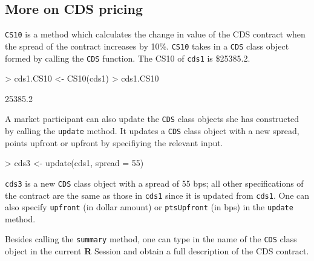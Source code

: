 \documentclass[a4paper]{article}
\renewenvironment{Schunk}{\vspace{\topsep}}{\vspace{\topsep}}
\begin{document}
\subsection{More on CDS pricing}

\texttt{CS10} is a method which calculates the change in value of the
CDS contract when the spread of the contract increases by
10\%. \texttt{CS10} takes in a \texttt{CDS} class object formed by
calling the \texttt{CDS} function. The CS10 of \texttt{cds1} is
\$25385.2.

\begin{Schunk}
\begin{Sinput}
> cds1.CS10 <- CS10(cds1)
> cds1.CS10
\end{Sinput}
\begin{Soutput}
[1] 25385.2
\end{Soutput}
\end{Schunk}

A market participant can also update the \texttt{CDS} class objects she
has constructed by calling the \texttt{update} method. It updates a
\texttt{CDS} class object with a new spread, points upfront or upfront
by specifiying the relevant input.

\begin{Schunk}
\begin{Sinput}
> cds3 <- update(cds1, spread = 55)
\end{Sinput}
\end{Schunk}

\texttt{cds3} is a new \texttt{CDS} class object with a spread of 55
bps; all other specifications of the contract are the same as those in
\texttt{cds1} since it is updated from \texttt{cds1}. One can also
specify \texttt{upfront} (in dollar amount) or \texttt{ptsUpfront} (in
bps) in the \texttt{update} method.

Besides calling the \texttt{summary} method, one can type in the name
of the \texttt{CDS} class object in the current \textbf{R} Session and
obtain a full description of the CDS contract.
\end{document}
